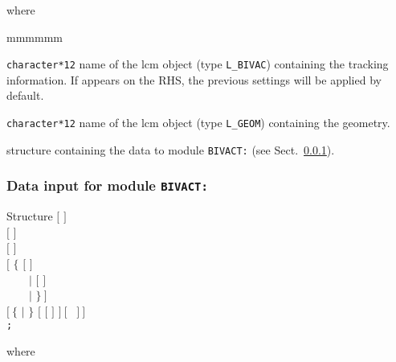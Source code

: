 \goodbreak
\noindent where
\begin{ListeDeDescription}{mmmmmm}

\item[\dusa{TRACK}] {\tt character*12} name of the {\sc lcm} object (type {\tt L\_BIVAC}) containing the {\sc tracking} information. If  appears on the RHS, the previous settings will be applied by default.

\item[\dusa{GEOM}] {\tt character*12} name of the {\sc lcm} object (type {\tt L\_GEOM}) containing the geometry.

\item[\dstr{bivact\_data}] structure containing the data to module {\tt BIVACT:} (see Sect.~\ref{sect:bivact_data}).

\end{ListeDeDescription}

\vskip 0.2cm

\subsubsection{Data input for module {\tt BIVACT:}}\label{sect:bivact_data}

\begin{DataStructure}{Structure }
$[$   $]$ \\
$[$   $]$ \\
$[$   $]$ \\
$[$ $\{$  $[$   $]$ \\
~~~~$|$  $[$   $]$ \\
~~~~$|$  $\}~]$ \\
$[~\{$  $|$  $\}$  $[$  $[$  $]$  $]~[$  ~$]~]$ \\
{\tt ;}
\end{DataStructure}

\noindent where


